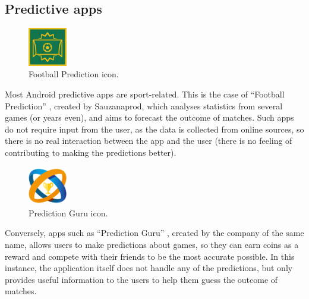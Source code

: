 \documentclass{mproj}
\begin{document}
\subsection*{Predictive apps}

\begin{figure}
	\vspace{-10pt}
	\centering
	\includegraphics[width=0.15\textwidth]{images/football_prediction}
	\caption{Football Prediction icon.}
	\vspace{-20pt}
\end{figure}

Most Android predictive apps are sport-related. This is the case of  ``Football Prediction'' \cite{footballprediction}, created by Sauzanaprod, which analyses statistics from several games (or years even), and aims to forecast the outcome of matches. Such apps do not require input from the user, as the data is collected from online sources, so there is no real interaction between the app and the user (there is no feeling of contributing to making the predictions better).\\

\begin{figure}
	\vspace{-10pt}
	\centering
	\includegraphics[width=0.15\textwidth]{images/prediction_guru}
	\caption{Prediction Guru icon.}
	\vspace{-30pt}
\end{figure}

Conversely, apps such as ``Prediction Guru'' \cite{predictionguru}, created by the company of the same name, allows users to make predictions about games, so they can earn coins as a reward and compete with their friends to be the most accurate possible. In this instance, the application itself does not handle any of the predictions, but only provides useful information to the users to help them guess the outcome of matches.

\end{document}

